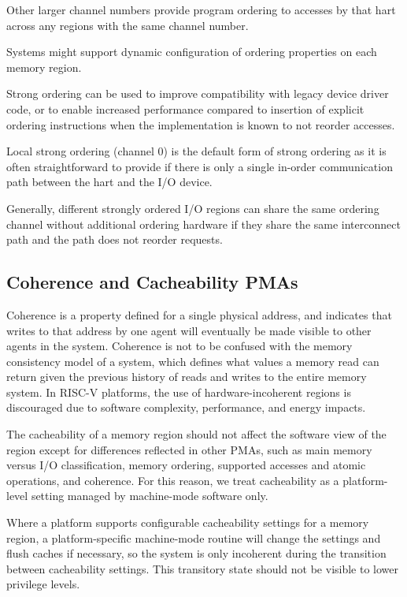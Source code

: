 Other larger channel numbers provide program ordering to accesses by
that hart across any regions with the same channel number.

Systems might support dynamic configuration of ordering properties on
each memory region.

\begin{commentary}
Strong ordering can be used to improve compatibility with legacy
device driver code, or to enable increased performance compared to
insertion of explicit ordering instructions when the implementation is
known to not reorder accesses.

Local strong ordering (channel 0) is the default form of strong
ordering as it is often straightforward to provide if there is only a
single in-order communication path between the hart and the I/O
device.

Generally, different strongly ordered I/O regions can share the same
ordering channel without additional ordering hardware if they share
the same interconnect path and the path does not reorder requests.
\end{commentary}

\subsection{Coherence and Cacheability PMAs}

Coherence is a property defined for a single physical address, and
indicates that writes to that address by one agent will eventually be
made visible to other agents in the system.  Coherence is not to be
confused with the memory consistency model of a system, which defines
what values a memory read can return given the previous history of
reads and writes to the entire memory system.  In RISC-V platforms,
the use of hardware-incoherent regions is discouraged due to software
complexity, performance, and energy impacts.

The cacheability of a memory region should not affect the software
view of the region except for differences reflected in other PMAs,
such as main memory versus I/O classification, memory ordering,
supported accesses and atomic operations, and coherence.  For this
reason, we treat cacheability as a platform-level setting managed by
machine-mode software only.

Where a platform supports configurable cacheability settings for a
memory region, a platform-specific machine-mode routine will change
the settings and flush caches if necessary, so the system is only
incoherent during the transition between cacheability settings.  This
transitory state should not be visible to lower privilege levels.

